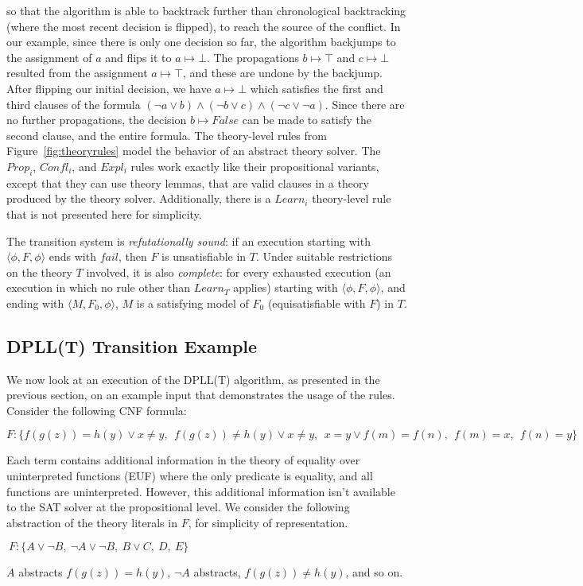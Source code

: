 \documentclass[11pt]{article}
\begin{document}
	so that the algorithm is able to 
	backtrack further than chronological
	backtracking (where the most 
	recent decision is flipped), to 
	reach the source of the conflict.
	In our example, since there is only 
	one decision so far, the algorithm
	backjumps to the assignment of 
	$a$ and flips it to $a \mapsto \bot$. The 
	propagations $b \mapsto \top$ and $c \mapsto 
	\bot$ resulted from the assignment 
	$a \mapsto \top$, and these are undone
	by the backjump. After flipping our 
	initial decision, we have $a \mapsto 
	\bot$ which satisfies
	the first and third clauses of the 
	formula $(\neg a \lor b) \land 
	(\neg b \lor c) \land (\neg c 
	\lor \neg a)$. Since there 
	are no further propagations, the 
	decision $b \mapsto False$ can be made 
	to satisfy the second clause, and the 
	entire formula. 
	The theory-level rules
	from Figure~\ref{fig:theoryrules} model 
	the behavior of an abstract 
	theory solver. The $\mathit{Prop_i}$, 
	$\mathit{Confl_i}$, and $\mathit{Expl_i}$ rules
	work exactly like their 
	propositional variants, except 
	that they can use theory lemmas, 
	that are valid clauses in a 
	theory produced by the theory
	solver. Additionally, there is a
	$Learn_i$ theory-level rule that is 
	not presented here for simplicity. 
	
	The transition system is 
	\textit{refutationally sound}:
	if an execution starting with 
	$\langle \phi, F, \phi \rangle$ ends 
	with $fail$, then $F$ is 
	unsatisfiable in $T$. Under suitable 
	restrictions on the theory $T$ 
	involved, it is also 
	\textit{complete}: for every exhausted
	execution (an execution in which no 
	rule other than $\mathit{Learn_T}$ applies)
	starting with 
	$\langle \phi, F, \phi \rangle$,
	and ending with 
	$\langle M, F_0, \phi \rangle$,
	$M$ is a satisfying model of 
	$F_0$ (equisatisfiable with $F$)
	in $T$.	
	
	\subsection{DPLL(T) Transition Example}
	\label{sec:transex}
	We now look at an execution of the 
	DPLL(T) algorithm, as presented in the 
	previous section, on an example input
	that demonstrates the usage of 
	the rules. Consider the following 
	CNF formula:
	\begin{center}
		$ F: \{f(g(z)) = h(y) \lor x \neq y,\ \ 
		f(g(z)) \neq h(y) \lor x \neq y,\ \ 
		x = y \lor f(m) = f(n),\ \ 
		f(m) = x,\ \ f(n) = y\}$
	\end{center}
	Each term contains 
	additional information in the theory 
	of equality over uninterpreted 
	functions (EUF) where the only 
	predicate is equality, and all
	functions are uninterpreted. However,
	this additional information isn't
	available to the SAT solver at 
	the propositional level. We 
	consider the following abstraction 
	of the theory literals in $F$, for 
	simplicity of representation. 
	\begin{center}
		$\ F: \{A \lor \neg B,\ \neg A \lor 
			\neg B,\ B \lor C,\ D,\ E\}$
	\end{center}
	$A$ abstracts $f(g(z)) = h(y)$,
	$\neg A$ abstracts, $f(g(z)) \neq h(y)$,
	and so on.
	
\end{document}
